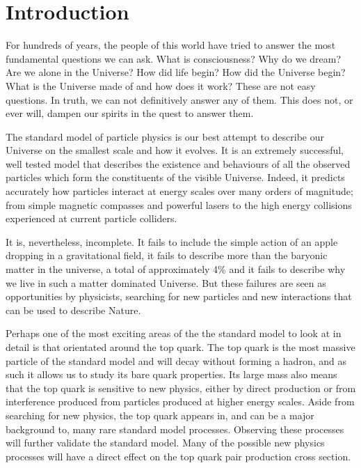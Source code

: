 \newpage\null\thispagestyle{empty}
\newpage\null\thispagestyle{empty}

\chapter{Introduction}
\label{ch:Introduction}

For hundreds of years, the people of this world have tried to answer the most fundamental questions we can ask.
What is consciousness?
Why do we dream?
Are we alone in the Universe?
How did life begin?
How did the Universe begin?
What is the Universe made of and how does it work?
These are not easy questions.
In truth, we can not definitively answer any of them.
This does not, or ever will, dampen our spirits in the quest to answer them.

The standard model of particle physics is our best attempt to describe our Universe on the smallest scale and how it evolves.
It is an extremely successful, well tested model that describes the existence and behaviours of all the observed particles which form the constituents of the visible Universe.
Indeed, it predicts accurately how particles interact at energy scales over many orders of magnitude; from simple magnetic compasses and powerful lasers to the high energy collisions experienced at current particle colliders.

It is, nevertheless, incomplete.
It fails to include the simple action of an apple dropping in a gravitational field, it fails to describe more than the baryonic matter in the universe, a total of approximately 4\% and it fails to describe why we live in such a matter dominated Universe.
But these failures are seen as opportunities by physicists, searching for new particles and new interactions that can be used to describe Nature.

Perhaps one of the most exciting areas of the the standard model to look at in detail is that orientated around the top quark.
The top quark is the most massive particle of the standard model and will decay without forming a hadron, and as such it allows us to study its bare quark properties.
Its large mass also means that the top quark is sensitive to new physics, either by direct production or from interference produced from particles produced at higher energy scales.
Aside from searching for new physics, the top quark appears in, and can be a major background to, many rare standard model processes.
Observing these processes will further validate the standard model. 
Many of the possible new physics processes will have a direct effect on the top quark pair production cross section.

